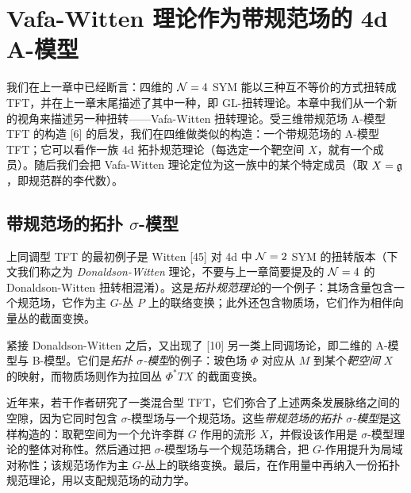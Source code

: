 \chapter{Vafa-Witten 理论作为带规范场的 4d A-模型}

我们在上一章中已经断言：四维的 $\mathcal{N}=4$ SYM 能以三种互不等价的方式扭转成 TFT，并在上一章末尾描述了其中一种，即 GL-扭转理论。本章中我们从一个新的视角来描述另一种扭转——Vafa-Witten 扭转理论。受三维带规范场 A-模型 TFT 的构造 [6] 的启发，我们在四维做类似的构造：一个带规范场的 A-模型 TFT；它可以看作一族 4d 拓扑规范理论（每选定一个靶空间 $X$，就有一个成员）。随后我们会把 Vafa-Witten 理论定位为这一族中的某个特定成员（取 $X=\mathfrak{g}$，即规范群的李代数）。


\section*{带规范场的拓扑 $\sigma$-模型}

上同调型 TFT 的最初例子是 Witten [45] 对 4d 中 $\mathcal{N}=2$ SYM 的扭转版本（下文我们称之为 \emph{Donaldson-Witten} 理论，不要与上一章简要提及的 $\mathcal{N}=4$ 的 Donaldson-Witten 扭转相混淆）。这是\emph{拓扑规范理论}的一个例子：其场含量包含一个规范场，它作为主 $G$-丛 $P$ 上的联络变换；此外还包含物质场，它们作为相伴向量丛的截面变换。

紧接 Donaldson-Witten 之后，又出现了 [10] 另一类上同调场论，即二维的 A-模型与 B-模型。它们是\emph{拓扑 $\sigma$-模型}的例子：玻色场 $\Phi$ 对应从 $M$ 到某个\emph{靶空间} $X$ 的映射，而物质场则作为拉回丛 $\Phi^*TX$ 的截面变换。

近年来，若干作者研究了一类混合型 TFT，它们弥合了上述两条发展脉络之间的空隙，因为它同时包含 $\sigma$-模型场与一个规范场。这些\emph{带规范场的拓扑 $\sigma$-模型}是这样构造的：取靶空间为一个允许李群 $G$ 作用的流形 $X$，并假设该作用是 $\sigma$-模型理论的整体对称性。然后通过把 $\sigma$-模型场与一个规范场耦合，把 $G$-作用提升为局域对称性；该规范场作为主 $G$-丛上的联络变换。最后，在作用量中再纳入一份拓扑规范理论，用以支配规范场的动力学。


